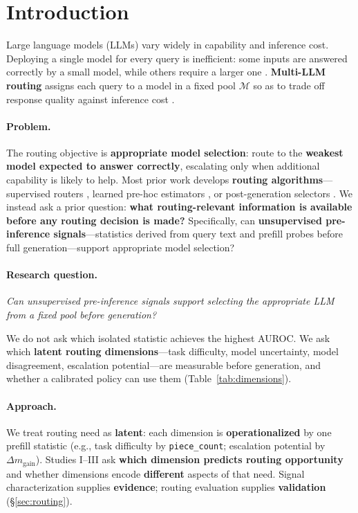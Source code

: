 
\section{Introduction}
\label{sec:intro}

Large language models (LLMs) vary widely in capability and inference cost.
Deploying a single model for every query is inefficient: some inputs are answered correctly by a small model, while others require a larger one \citep{hu2024routerbench,ding2024hybrid,chen2023frugalgpt}.
\textbf{Multi-LLM routing} assigns each query to a model in a fixed pool $\mathcal{M}$ so as to trade off response quality against inference cost \citep{ong2024routellm}.

\paragraph{Problem.}
The routing objective is \textbf{appropriate model selection}: route to the \textbf{weakest model expected to answer correctly}, escalating only when additional capability is likely to help.
Most prior work develops \textbf{routing algorithms}---supervised routers \citep{ong2024routellm,ding2024hybrid,feng2025graphrouter}, learned pre-hoc estimators \citep{cao2026scope}, or post-generation selectors \citep{guha2024smoothie,niu2026cascal}.
We instead ask a prior question: \textbf{what routing-relevant information is available before any routing decision is made?}
Specifically, can \textbf{unsupervised pre-inference signals}---statistics derived from query text and prefill probes before full generation---support appropriate model selection?

\paragraph{Research question.}
\textit{Can unsupervised pre-inference signals support selecting the appropriate LLM from a fixed pool before generation?}

We do not ask which isolated statistic achieves the highest AUROC.
We ask which \textbf{latent routing dimensions}---task difficulty, model uncertainty, model disagreement, escalation potential---are measurable before generation, and whether a calibrated policy can use them (Table~\ref{tab:dimensions}).

\paragraph{Approach.}
We treat routing need as \textbf{latent}: each dimension is \textbf{operationalized} by one prefill statistic (e.g., task difficulty by \texttt{piece\_count}; escalation potential by $\Delta m_{\mathrm{gain}}$).
Studies I--III ask \textbf{which dimension predicts routing opportunity} and whether dimensions encode \textbf{different} aspects of that need.
Signal characterization supplies \textbf{evidence}; routing evaluation supplies \textbf{validation} (\S\ref{sec:routing}).

